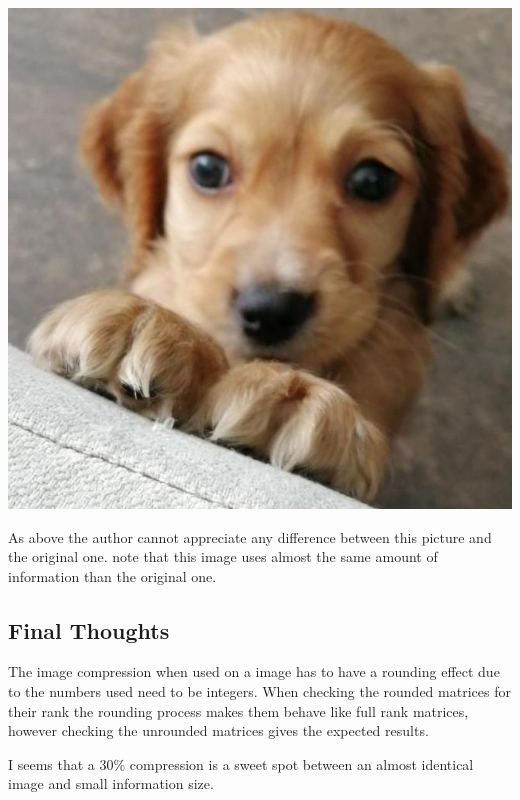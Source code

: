 \documentclass[
]{article}
\begin{document}
\includegraphics{blipf325.jpg}

As above the author cannot appreciate any difference between this
picture and the original one. note that this image uses almost the same
amount of information than the original one.

\hypertarget{final-thoughts}{%
\subsection{Final Thoughts}\label{final-thoughts}}

The image compression when used on a image has to have a rounding effect
due to the numbers used need to be integers. When checking the rounded
matrices for their rank the rounding process makes them behave like full
rank matrices, however checking the unrounded matrices gives the
expected results.

I seems that a 30\% compression is a sweet spot between an almost
identical image and small information size.
\end{document}
